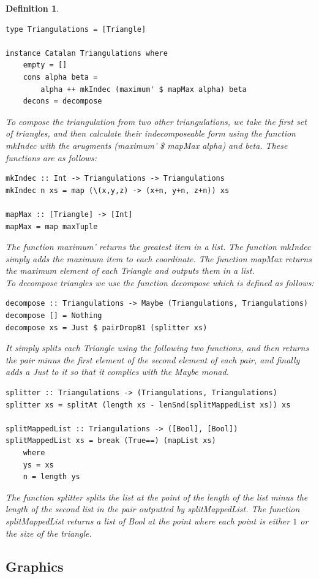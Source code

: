 \documentclass[12pt]{article}
\newtheorem{definition}{Definition}
\begin{document}
\begin{definition}
\begin{lstlisting}
type Triangulations = [Triangle]

instance Catalan Triangulations where
	empty = []	
	cons alpha beta = 
		alpha ++ mkIndec (maximum' $ mapMax alpha) beta
	decons = decompose
\end{lstlisting}
To compose the triangulation from two other triangulations, we take the first set of triangles, and then calculate their indecomposeable form using the function {\it mkIndec} with the arugments {\it (maximum' \$ mapMax alpha)} and {\it beta}. These functions are as follows:
\begin{lstlisting}
mkIndec :: Int -> Triangulations -> Triangulations
mkIndec n xs = map (\(x,y,z) -> (x+n, y+n, z+n)) xs

mapMax :: [Triangle] -> [Int]
mapMax = map maxTuple
\end{lstlisting}
The function {\it maximum'} returns the greatest item in a list. The function {\it mkIndec} simply adds the maximum item to each coordinate. The function {\it mapMax} returns the maximum element of each Triangle and outputs them in a list.\\
To decompose triangles we use the function {\it decompose} which is defined as follows:
\begin{lstlisting}
decompose :: Triangulations -> Maybe (Triangulations, Triangulations)
decompose [] = Nothing
decompose xs = Just $ pairDropB1 (splitter xs)
\end{lstlisting}
It simply splits each Triangle using the following two functions, and then returns the pair minus the first element of the second element of each pair, and finally adds a {\it Just} to it so that it complies with the Maybe monad.
\begin{lstlisting}
splitter :: Triangulations -> (Triangulations, Triangulations)
splitter xs = splitAt (length xs - lenSnd(splitMappedList xs)) xs

splitMappedList :: Triangulations -> ([Bool], [Bool])
splitMappedList xs = break (True==) (mapList xs)
	where
	ys = xs
	n = length ys 
\end{lstlisting}
The function {\it splitter} splits the list at the point of the length of the list minus the length of the second list in the pair outputted by {\it splitMappedList}. The function {\it splitMappedList} returns a list of {\it Bool} at the point where each point is either $1$ or the size of the triangle.

\subsection{Graphics}

\end{definition}
\end{document}
